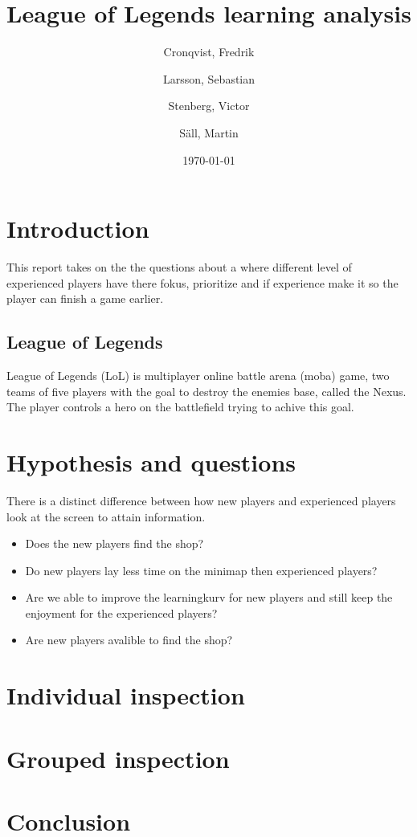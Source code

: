 \documentclass{article}
\author{Cronqvist, Fredrik \and Larsson, Sebastian \and Stenberg, Victor \and S\"{a}ll, Martin}
\date{\today}
\title{League of Legends learning analysis}
\begin{document}
\maketitle

\section{Introduction}
This report takes on the the questions about a where different level of experienced players have there fokus, prioritize and if experience make it so the player can finish a game earlier. 

\subsection{League of Legends}
League of Legends (LoL) is multiplayer online battle arena (moba) game, two teams of five players with the goal to destroy the enemies base, called the Nexus. The player controls a hero on the battlefield trying to achive this goal. 

\section{Hypothesis and questions}
There is a distinct difference between how new players and experienced players look at the screen to attain information.
\begin{itemize}
\item Does the new players find the shop?
\item Do new players lay less time on the minimap then experienced players?
\item Are we able to improve the learningkurv for new players and still keep the enjoyment for the experienced players?
\item Are new players avalible to find the shop? %
\end{itemize}

\section{Individual inspection}

\section{Grouped inspection}

\section{Conclusion}
\end{document}
